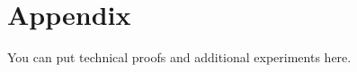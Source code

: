 \documentclass{article} \author{Simon Théorêt}
\begin{document}







 


\appendix
\section{Appendix}
You can put technical proofs and additional experiments here.
\end{document}
